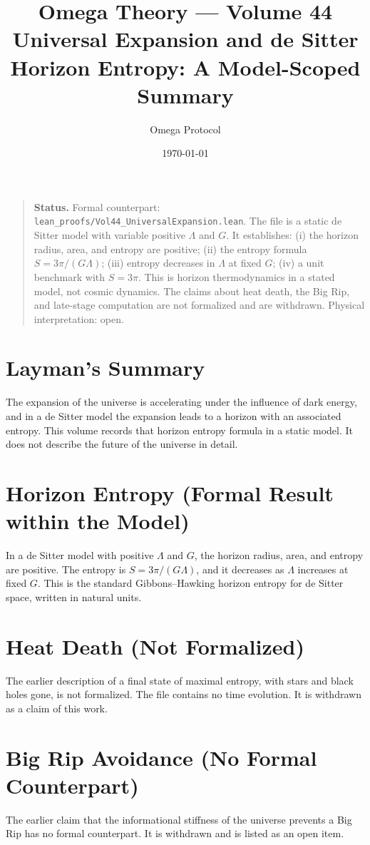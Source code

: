 \documentclass[11pt, a4paper]{article}
\title{Omega Theory --- Volume 44\\\Large Universal Expansion and de Sitter Horizon Entropy: A Model-Scoped Summary}
\author{Omega Protocol}
\date{\today}
\begin{document}
\maketitle

\begin{quote}
\textbf{Status.} Formal counterpart: \texttt{lean\_proofs/Vol44\_UniversalExpansion.lean}. The file is a static de Sitter model with variable positive $\Lambda$ and $G$. It establishes: (i) the horizon radius, area, and entropy are positive; (ii) the entropy formula $S = 3\pi/(G\Lambda)$; (iii) entropy decreases in $\Lambda$ at fixed $G$; (iv) a unit benchmark with $S = 3\pi$. This is horizon thermodynamics in a stated model, not cosmic dynamics. The claims about heat death, the Big Rip, and late-stage computation are not formalized and are withdrawn. Physical interpretation: open.
\end{quote}

\section*{Layman's Summary}
The expansion of the universe is accelerating under the influence of dark energy, and in a de Sitter model the expansion leads to a horizon with an associated entropy. This volume records that horizon entropy formula in a static model. It does not describe the future of the universe in detail.

\section{Horizon Entropy (Formal Result within the Model)}
In a de Sitter model with positive $\Lambda$ and $G$, the horizon radius, area, and entropy are positive. The entropy is $S = 3\pi/(G\Lambda)$, and it decreases as $\Lambda$ increases at fixed $G$. This is the standard Gibbons--Hawking horizon entropy for de Sitter space, written in natural units.

\section{Heat Death (Not Formalized)}
The earlier description of a final state of maximal entropy, with stars and black holes gone, is not formalized. The file contains no time evolution. It is withdrawn as a claim of this work.

\section{Big Rip Avoidance (No Formal Counterpart)}
The earlier claim that the informational stiffness of the universe prevents a Big Rip has no formal counterpart. It is withdrawn and is listed as an open item.
\end{document}
